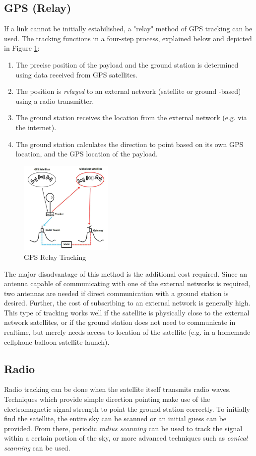 \subsection{GPS (Relay)}
If a link cannot be initially estabilished, a "relay" method of GPS tracking can be used. The tracking functions in a four-step process, explained below and depicted in Figure \ref{fig:gps_relay}:
\begin{enumerate}
    \item The precise position of the payload and the ground station is determined using data received from GPS satellites.
    \item The position is \textit{relayed} to an external network (satellite or ground -based) using a radio transmitter.
    \item The ground station receives the location from the external network (e.g. via the internet).
    \item The ground station calculates the direction to point based on its own GPS location, and the GPS location of the payload.
\end{enumerate}

\begin{figure}[!htb]
  \centering
  \includegraphics[width=0.4\textwidth]{gps_relay}
  \caption{GPS Relay Tracking \cite{site-highaltitudescienceTrackingWeather}}
  \label{fig:gps_relay}
\end{figure}

The major disadvantage of this method is the additional cost required. Since an antenna capable of communicating with one of the external networks is required, two antennas are needed if direct communication with a ground station is desired. Further, the cost of subscribing to an external network is generally high. This type of tracking works well if the satellite is physically close to the external network satellites, or if the ground station does not need to communicate in realtime, but merely needs access to location of the satellite (e.g. in a homemade cellphone balloon satellite launch).

\subsection{Radio}
Radio tracking can be done when the satellite itself transmits radio waves. Techniques which provide simple direction pointing make use of the electromagnetic signal strength to point the ground station correctly. To initially find the satellite, the entire sky can be scanned or an initial guess can be provided. From there, periodic \textit{radius scanning} can be used to track the signal within a certain portion of the sky, or more advanced techniques such as \textit{conical scanning} can be used.